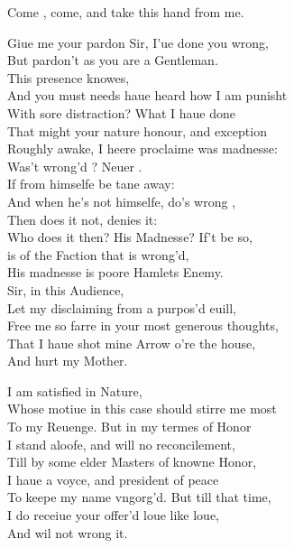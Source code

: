 \documentclass[a5paper,DIV=calc,11pt]{scrbook}
\begin{document}
\begin{drama*}
    
    \kingspeaks Come \ham, come, and take this hand from me.
    
    \hamspeaks Giue me your pardon Sir, I'ue done you wrong,\\
    But pardon't as you are a Gentleman.\\
    This presence knowes,\\
    And you must needs haue heard how I am punisht\\
    With sore distraction? What I haue done\\
    That might your nature honour, and exception\\
    Roughly awake, I heere proclaime was madnesse:\\
    Was't \ham wrong'd \laer? Neuer \ham.\\
    If \ham from himselfe be tane away:\\
    And when he's not himselfe, do's wrong \laer,\\
    Then \ham does it not, \ham denies it:\\
    Who does it then? His Madnesse? If't be so,\\
    \ham is of the Faction that is wrong'd,\\
    His madnesse is poore Hamlets Enemy.\\
    Sir, in this Audience,\\
    Let my disclaiming from a purpos'd euill,\\
    Free me so farre in your most generous thoughts,\\
    That I haue shot mine Arrow o're the house,\\
    And hurt my Mother.
    
    \laerspeaks I am satisfied in Nature,\\
    Whose motiue in this case should stirre me most\\
    To my Reuenge. But in my termes of Honor\\
    I stand aloofe, and will no reconcilement,\\
    Till by some elder Masters of knowne Honor,\\
    I haue a voyce, and president of peace\\
    To keepe my name vngorg'd. But till that time,\\
    I do receiue your offer'd loue like loue,\\
    And wil not wrong it.
    

\end{drama*}
\end{document}
